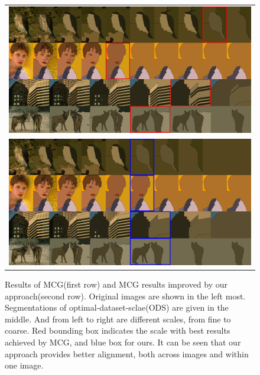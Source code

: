 \begin{figure}[tb]
\begin{center}
\begin{tabular}{c}
\includegraphics[width=14.7cm]{scale-aware/fig/vis/stack_1.png} \\
\includegraphics[width=14.7cm]{scale-aware/fig/vis/stack_2.png}
\end{tabular}
\end{center}
\caption{Results of MCG(first row) and MCG results improved by our approach(second row). Original images are shown in the left most. Segmentations of optimal-dataset-sclae(ODS) are given in the middle. And from left to right are different scales, from fine to coarse. Red bounding box indicates the scale with best results achieved by MCG, and blue box for ours. It can be seen that our approach provides better alignment, both across images and within one image. }
\label{fig:mcg_vis2}
\end{figure}



